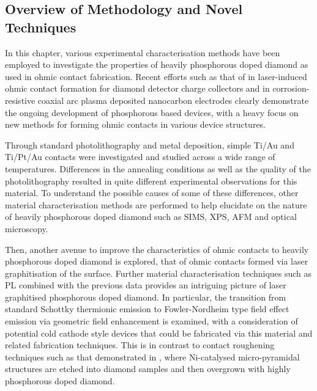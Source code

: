 \subsection{Overview of Methodology and Novel Techniques}
In this chapter, various experimental characterisation methods have been employed to investigate the properties of heavily phosphorous doped diamond as used in ohmic contact fabrication. Recent efforts such as that of \cite{abubakr2022} in laser-induced ohmic contact formation for diamond detector charge collectors and \cite{valappil2023} in corrosion-resistive coaxial arc plasma deposited nanocarbon electrodes clearly demonstrate the ongoing development of phosphorous based devices, with a heavy focus on new methods for forming ohmic contacts in various device structures.

Through standard photolithography and metal deposition, simple Ti/Au and Ti/Pt/Au contacts were investigated and studied across a wide range of temperatures. Differences in the annealing conditions as well as the quality of the photolithography resulted in quite different experimental observations for this material. To understand the possible causes of some of these differences, other material characterisation methods are performed to help elucidate on the nature of heavily phosphorous doped diamond such as SIMS, XPS, AFM and optical microscopy.

Then, another avenue to improve the characteristics of ohmic contacts to heavily phosphorous doped diamond is explored, that of ohmic contacts formed via laser graphitisation of the surface. Further material characterisation techniques such as PL combined with the previous data provides an intriguing picture of laser graphitised phosphorous doped diamond. In particular, the transition from standard Schottky thermionic emission to Fowler-Nordheim type field effect emission via geometric field enhancement is examined, with a consideration of potential cold cathode style devices that could be fabricated via this material and related fabrication techniques. This is in contrast to contact roughening techniques such as that demonstrated in \cite{temahuki2017}, where Ni-catalysed micro-pyramidal  structures are etched into  diamond samples and then overgrown with highly phosphorous doped diamond.

